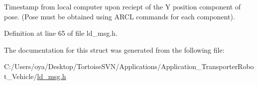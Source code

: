 Timestamp from local computer upon reciept of the Y position component of pose. (Pose must be obtained using A\+R\+CL commands for each component). 

Definition at line 65 of file ld\+\_\+msg.\+h.



The documentation for this struct was generated from the following file\+:\begin{DoxyCompactItemize}
\item 
C\+:/\+Users/oya/\+Desktop/\+Tortoise\+S\+V\+N/\+Applications/\+Application\+\_\+\+Transporter\+Robot\+\_\+\+Vehicle/\mbox{\hyperlink{ld__msg_8h}{ld\+\_\+msg.\+h}}\end{DoxyCompactItemize}
